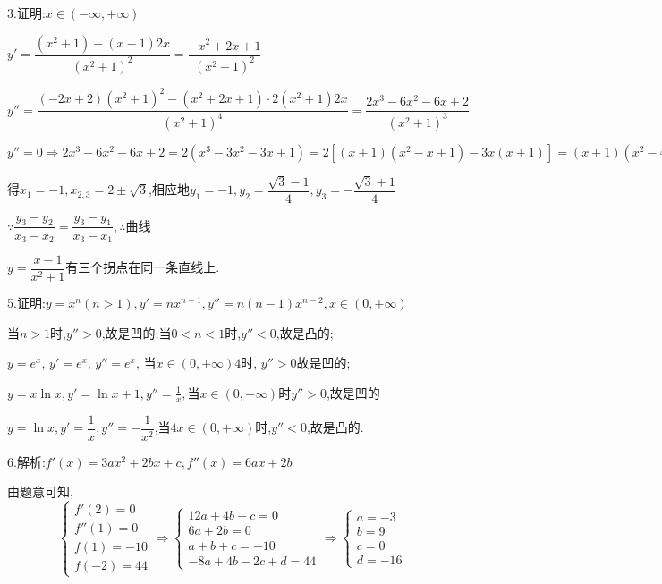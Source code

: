 3.证明:$x \in \left( { - \infty , + \infty } \right)$

$y' = \dfrac{{\left( {{x^2} + 1} \right) - \left( {x - 1} \right)2x}}{{{{\left( {{x^2} + 1} \right)}^2}}} = \dfrac{{ - {x^2} + 2x + 1}}{{{{\left( {{x^2} + 1} \right)}^2}}}$

$y'' = \dfrac{{\left( { - 2x + 2} \right){{\left( {{x^2} + 1} \right)}^2} - \left( {{x^2} + 2x + 1} \right) \cdot 2\left( {{x^2} + 1} \right)2x}}{{{{\left( {{x^2} + 1} \right)}^4}}} = \dfrac{{2{x^3} - 6{x^2} - 6x + 2}}{{{{\left( {{x^2} + 1} \right)}^3}}}$

$y'' = 0 \Rightarrow 2{x^3} - 6{x^2} - 6x + 2 = 2\left( {{x^3} - 3{x^2} - 3x + 1} \right) = 2\left[ {\left( {x + 1} \right)\left( {{x^2} - x + 1} \right) - 3x\left( {x + 1} \right)} \right] = \left( {x + 1} \right)\left( {{x^2} - 4x + 1} \right) = 0$

得${x_1} =  - 1,{x_{2,3}} = 2 \pm \sqrt 3 $,相应地${y_1} =  - 1,{y_2} = \dfrac{{\sqrt 3  - 1}}{4},{y_3} =  - \dfrac{{\sqrt 3  + 1}}{4}$

$\because \dfrac{{{y_3} - {y_2}}}{{{x_3} - {x_2}}} = \dfrac{{{y_3} - {y_1}}}{{{x_3} - {x_1}}},\therefore $曲线

$y = \dfrac{{x - 1}}{{{x^2} + 1}}$有三个拐点在同一条直线上.

5.证明:$y = {x^n}\left( {n > 1} \right),y' = n{x^{n - 1}},y'' = n\left( {n - 1} \right){x^{n - 2}},x \in \left( {0, + \infty } \right)$

当$n > 1$时,$y'' > 0$,故是凹的;当$0 < n < 1$时,$y'' < 0$,故是凸的;

$y = {e^x}$, $y' = {e^x}$, $y'' = {e^x}$, 当$x \in \left( {0, + \infty } \right)4$时, $y'' > 0$故是凹的;

$y = x\ln x,y' = \ln x + 1,y'' = \frac{1}{x},$当$x \in \left( {0, + \infty } \right)$时$y'' > 0$,故是凹的

$y = \ln x,y' = \dfrac{1}{x},y'' =  - \dfrac{1}{{{x^2}}}$,当$4x \in \left( {0, + \infty } \right)$时,$y'' < 0$,故是凸的.

6.解析:$f'\left( x \right) = 3a{x^2} + 2bx + c,f''\left( x \right) = 6ax + 2b$

 由题意可知,\[\left\{ {\begin{array}{*{20}{c}}
{f'(2) = 0}\\
{f''(1) = 0}\\
{f(1) =  - 10}\\
{f( - 2) = 44}
\end{array} \Rightarrow \left\{ {\begin{array}{*{20}{c}}
{12a + 4b + c = 0}\\
{6a + 2b = 0}\\
{a + b + c =  - 10}\\
{ - 8a + 4b - 2c + d = 44}
\end{array} \Rightarrow \left\{ {\begin{array}{*{20}{c}}
{a =  - 3}\\
{b = 9}\\
{c = 0}\\
{d =  - 16}
\end{array}} \right.} \right.} \right.\]

